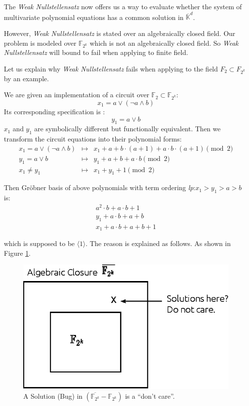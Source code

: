 The {\it Weak Nullstellensatz} now offers us a way to evaluate whether the system of multivariate polynomial equations has a common solution 
in ${\overline {\mathbb{K}}}^d$.

However, {\it Weak Nullstellensatz} is stated over an algebraically closed field.
Our problem is modeled over $\mathbb{F}_{2^{k}}$ which is not an algebraically closed field. 
So {\it Weak Nullstellensatz} will bound to fail when applying to finite field.

Let us explain why {\it Weak Nullstellensatz} fails when applying to the field $F_{2}\subset F_{2^{k}}$ by an example.
\begin{Example} \label{exp:wnfail}
We are given an implementation of a circuit over $\mathbb{F}_2 \subset \mathbb{F}_{2^{k}}$: 
\begin{equation}
x_1=a \vee (\neg a \wedge b)
\end{equation}
Its corresponding specification is :
\begin{equation}
y_1=a \vee b
\end{equation}
$x_1$ and $y_1$ are symbolically different but functionally equivalent.  
Then we transform the circuit equations into their polynomial forms:
\begin{eqnarray}
x_1=a \vee (\neg a \wedge b) &\mapsto& x_1 + a + b\cdot (a+1) + a\cdot b \cdot (a+1) \pmod 2 \nonumber \\
y_1=a \vee b  &\mapsto& y_{1}+a+b+a\cdot b \pmod 2 \nonumber \\
x_1 \neq y_{1}  &\mapsto& x_1+y_1+1 \pmod 2 \nonumber
\end{eqnarray}
\end{Example}
Then Gr\"obner basis of above polynomials with term ordering {\it lp}:$x_{1}>y_{1}>a>b$ is: 
\begin{eqnarray}
a^{2}\cdot b+a \cdot b+1 \nonumber \\
y_{1}+a \cdot b+a+b \nonumber \\
x_{1}+a \cdot b+a+b+1 \nonumber 
\end{eqnarray}

which is supposed to be $\langle 1\rangle$. The reason is explained as follows.
As shown in Figure \ref{fig:closure}. 
\begin{figure}[htb]
\centerline{
\includegraphics[scale=1]{./figures/closure.eps}
}
\caption{ A Solution (Bug) in $(\overline{\mathbb{F}_{2^{k}}}-\mathbb{F}_{2^k})$ is a ``don't care''.}
\label{fig:closure}
\end{figure}

